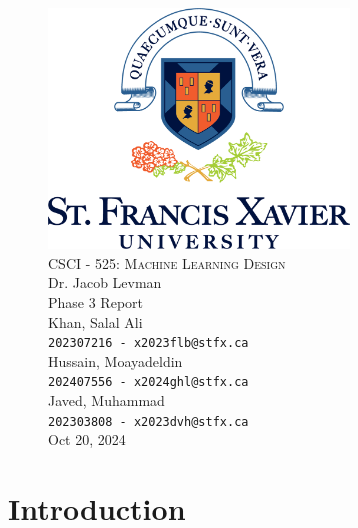 \documentclass[a4paper,12pt]{article}
\begin{document}
\begin{titlepage}

\begin{figure}[H]
  \centering
  \includegraphics[width=8cm]{../stfx_logo.png}\\
  \vspace{1cm}
  {\scshape\Large CSCI - 525: Machine Learning Design \\}
  \vspace{0.5cm}
  {\large Dr. Jacob Levman \\}
  \vspace{1cm}
  {\Large Phase 3 Report \\}
  \vspace{1.8cm}
  {\large Khan, Salal Ali\\ \texttt{202307216 - x2023flb@stfx.ca} \\}
  \vspace{0.5cm}
  {\large Hussain, Moayadeldin\\ \texttt{202407556 - x2024ghl@stfx.ca} \\}
  \vspace{0.5cm}
  {\large Javed, Muhammad\\ \texttt{202303808 - x2023dvh@stfx.ca} \\}
  \vfill
  \vspace{0.5cm}
  {\large Oct 20, 2024 \\}
\end{figure}

\end{titlepage}

\section*{Introduction}
\end{document}
